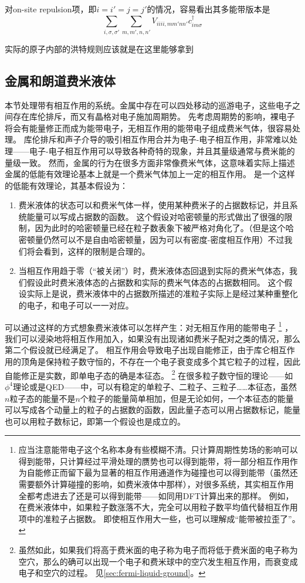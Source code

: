 对on-site repulsion项，即$i=i'=j=j'$的情况，容易看出其多能带版本是
\[
    \sum_{i, \sigma, \sigma'} \sum_{m, m', n, n'} V_{iiii,mm' nn'} c^\dagger_{i m \sigma} 
\]

实际的原子内部的洪特规则应该就是在这里能够拿到

\subsection{金属和朗道费米液体}

本节处理带有相互作用的系统。金属中存在可以四处移动的巡游电子，这些电子之间存在库伦排斥，而又有晶格对电子施加周期势。
先考虑周期势的影响，裸电子将会有能量修正而成为能带电子，无相互作用的能带电子组成费米气体，很容易处理。
库伦排斥和声子介导的吸引相互作用合并为电子-电子相互作用，非常难以处理——电子-电子相互作用可以导致各种奇特的现象，并且其量级通常与费米能的量级一致。
然而，金属的行为在很多方面非常像费米气体，这意味着实际上描述金属的低能有效理论基本上就是一个费米气体加上一定的相互作用。
是一个这样的低能有效理论，其基本假设为：
\begin{enumerate}
    \item 费米液体的状态可以和费米气体一样，使用某种费米子的占据数标记，并且系统能量可以写成占据数的函数。
    这个假设对哈密顿量的形式做出了很强的限制，因为此时的哈密顿量已经在粒子数表象下被严格对角化了。（但是这个哈密顿量仍然可以不是自由哈密顿量，因为可以有密度-密度相互作用）不过我们将会看到，这样的限制是合理的。
    \item 当相互作用趋于零（“被关闭”）时，费米液体态回退到实际的费米气体态，我们假设此时费米液体态的占据数和实际的费米气体态的占据数相同。
    这个假设实际上是说，费米液体中的占据数所描述的准粒子实际上是经过某种重整化的电子，和电子可以一一对应。
\end{enumerate}

可以通过这样的方式想象费米液体可以怎样产生：对无相互作用的能带电子%
\footnote{
    应当注意能带电子这个名称本身有些模糊不清。只计算周期性势场的影响可以得到能带，只计算经过平滑处理的赝势也可以得到能带，将一部分相互作用作为自能修正而留下最为显著的相互作用通道作为碰撞也可以得到能带（虽然还需要额外计算碰撞的影响，如费米液体中那样），对很多系统，其实相互作用全都考虑进去了还是可以得到能带——如同用DFT计算出来的那样。
    例如，在费米液体中，如果粒子数涨落不大，完全可以用粒子数平均值代替相互作用项中的准粒子占据数。
    即使相互作用大一些，也可以理解成“能带被拉歪了”。
}%
，我们可以浸染地将相互作用加入，如果没有出现诸如费米子配对之类的情况，那么第二个假设就已经满足了。
相互作用会导致电子出现自能修正，由于库仑相互作用的顶角是保持粒子数守恒的，不存在一个电子衰变成多个其它粒子的过程，因此自能修正是实数，即单电子态的确是本征态。%
\footnote{
    虽然如此，如果我们将高于费米面的电子称为电子而将低于费米面的电子称为空穴，那么的确可以出现一个电子和费米球中的空穴发生相互作用，而衰变成电子和空穴的过程。
    见\autoref{sec:fermi-liquid-ground}。
}%
在很多粒子数守恒的理论——如$\phi^4$理论或是QED——中，可以有稳定的单粒子、二粒子、三粒子……本征态，虽然$n$粒子态的能量不是$n$个粒子的能量简单相加，但是无论如何，一个本征态的能量可以写成各个动量上的粒子的占据数的函数，因此量子态可以用占据数标记，能量也可以用粒子数标记，即第一个假设也是成立的。

